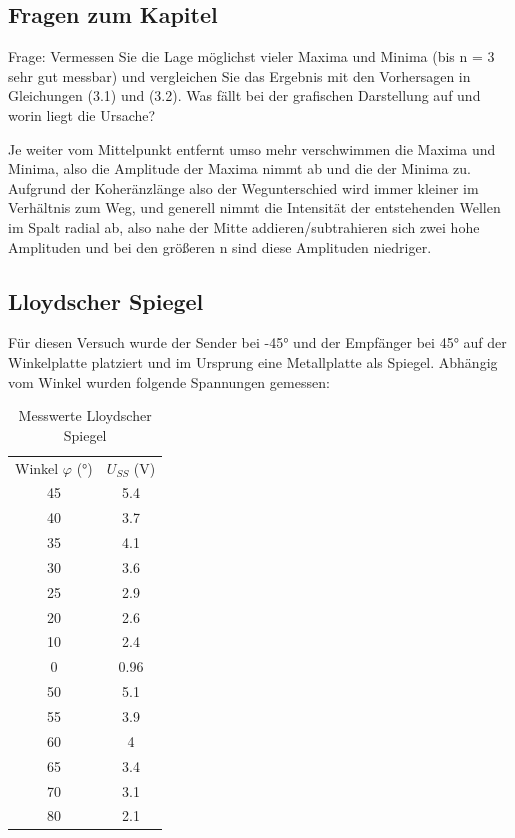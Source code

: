 \documentclass[
  headings=optiontotocandhead,
  twoside,
  openright,
  numbers=noenddot,
  toc=flat,
  11pt,
  parskip=full,
  listof=flat,
  bibliography=totoc,
  a4paper,
  DIV=14,
  BCOR=22mm,
  headheight=5mm,
  headinclude=true,
]{scrartcl}
\begin{document}
\subsection{Fragen zum Kapitel}

Frage: Vermessen Sie die Lage möglichst vieler Maxima und Minima (bis n = 3 sehr gut messbar) und vergleichen
Sie das Ergebnis mit den Vorhersagen in Gleichungen (3.1) und (3.2). Was fällt bei der grafischen Darstellung auf
und worin liegt die Ursache?

Je weiter vom Mittelpunkt entfernt umso mehr verschwimmen die Maxima und Minima, also die Amplitude der Maxima nimmt ab und die der Minima zu. Aufgrund der Koheränzlänge also der Wegunterschied wird immer kleiner im Verhältnis zum Weg, und generell nimmt die Intensität der entstehenden Wellen im Spalt radial ab, also nahe der Mitte addieren/subtrahieren sich zwei hohe Amplituden und bei den größeren n sind diese Amplituden niedriger.

\subsection{Lloydscher Spiegel}

Für diesen Versuch wurde der Sender bei -45° und der Empfänger bei 45° auf der Winkelplatte platziert und im Ursprung eine Metallplatte als Spiegel. Abhängig vom Winkel wurden folgende Spannungen gemessen:

\begin{table}[H]
  \centering
  \setlength{\tabcolsep}{10pt}
  \begin{tabular}{ |c|c| }
    \multicolumn{1}{c}{Winkel $\varphi$ (°)} & \multicolumn{1}{c}{$U_{SS}$ (V)} \\
    45  & 5.4 \\
    40  & 3.7 \\
    35 & 4.1 \\
    30 & 3.6 \\
    25 & 2.9 \\
    20 & 2.6 \\
    10 & 2.4 \\
    0 & 0.96  \\
    50 & 5.1 \\
    55 & 3.9\\
    60 & 4 \\
    65 & 3.4 \\
    70 & 3.1 \\
    80 & 2.1 \\
  \end{tabular}
  \caption{Messwerte Lloydscher Spiegel}
  \label{tab:doppelspalt1}
\end{table}
\end{document}
